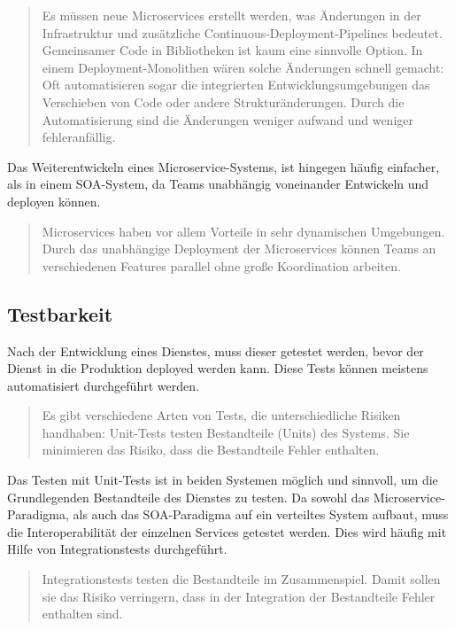 \begin{quotation}
	\frqq Es müssen neue Microservices erstellt werden, was Änderungen in der Infrastruktur und zusätzliche Continuous-Deployment-Pipelines bedeutet. Gemeinsamer Code in Bibliotheken ist kaum eine sinnvolle Option. In einem Deployment-Monolithen wären solche Änderungen schnell gemacht: Oft automatisieren sogar die integrierten Entwicklungsumgebungen das Verschieben von Code oder andere Strukturänderungen. Durch die Automatisierung sind die Änderungen weniger aufwand und weniger fehleranfällig.\flqq\ \cite[S. 119f]{EWolff2016:Microservices}
\end{quotation}

Das Weiterentwickeln eines Microservice-Systems, ist hingegen häufig einfacher, als in einem SOA-System, da Teams unabhängig voneinander Entwickeln und deployen können.

\begin{quotation}
	\frqq Microservices haben vor allem Vorteile in sehr dynamischen Umgebungen. Durch das unabhängige Deployment der Microservices können Teams an verschiedenen Features parallel ohne große Koordination arbeiten.\flqq\ \cite[S. 120]{EWolff2016:Microservices}
\end{quotation}


\subsection{Testbarkeit}
\label{subsec:Testbarkeit}
Nach der Entwicklung eines Dienstes, muss dieser getestet werden, bevor der Dienst in die Produktion deployed werden kann. Diese Tests können meistens automatisiert durchgeführt werden.

\begin{quotation}
	\frqq Es gibt verschiedene Arten von Tests, die unterschiedliche Risiken handhaben: Unit-Tests testen Bestandteile (Units) des Systems. Sie minimieren das Risiko, dass die Bestandteile Fehler enthalten.\flqq\ \cite[S. 219]{EWolff2016:Microservices}
\end{quotation}

Das Testen mit Unit-Tests ist in beiden Systemen möglich und sinnvoll, um die Grundlegenden Bestandteile des Dienstes zu testen. Da sowohl das Microservice-Paradigma, als auch das SOA-Paradigma auf ein verteiltes System aufbaut, muss die Interoperabilität der einzelnen Services getestet werden. Dies wird häufig mit Hilfe von Integrationstests durchgeführt.

\begin{quotation}
	\frqq Integrationstests testen die Bestandteile im Zusammenspiel. Damit sollen sie das Risiko verringern, dass in der Integration der Bestandteile Fehler enthalten sind.\flqq\ \cite[S. 220]{EWolff2016:Microservices}
\end{quotation}

